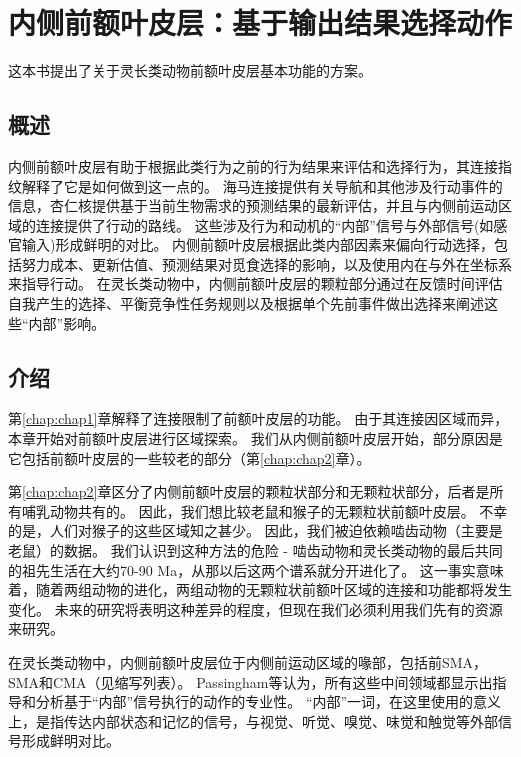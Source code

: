 \chapter{内侧前额叶皮层：基于输出结果选择动作} \label{chap:chap3}

这本书提出了关于灵长类动物前额叶皮层基本功能的方案。



\section{概述}
内侧前额叶皮层有助于根据此类行为之前的行为结果来评估和选择行为，其连接指纹解释了它是如何做到这一点的。
海马连接提供有关导航和其他涉及行动事件的信息，杏仁核提供基于当前生物需求的预测结果的最新评估，并且与内侧前运动区域的连接提供了行动的路线。
这些涉及行为和动机的“内部”信号与外部信号(如感官输入)形成鲜明的对比。
内侧前额叶皮层根据此类内部因素来偏向行动选择，包括努力成本、更新估值、预测结果对觅食选择的影响，以及使用内在与外在坐标系来指导行动。
在灵长类动物中，内侧前额叶皮层的颗粒部分通过在反馈时间评估自我产生的选择、平衡竞争性任务规则以及根据单个先前事件做出选择来阐述这些“内部”影响。\par



\section{介绍}

第\ref{chap:chap1}章解释了连接限制了前额叶皮层的功能。
由于其连接因区域而异，本章开始对前额叶皮层进行区域探索。
我们从内侧前额叶皮层开始，部分原因是它包括前额叶皮层的一些较老的部分（第\ref{chap:chap2}章）。\par

第\ref{chap:chap2}章区分了内侧前额叶皮层的颗粒状部分和无颗粒状部分，后者是所有哺乳动物共有的。
因此，我们想比较老鼠和猴子的无颗粒状前额叶皮层。
不幸的是，人们对猴子的这些区域知之甚少。
因此，我们被迫依赖啮齿动物（主要是老鼠）的数据。
我们认识到这种方法的危险 - 啮齿动物和灵长类动物的最后共同的祖先生活在大约70-90 Ma，从那以后这两个谱系就分开进化了。
这一事实意味着，随着两组动物的进化，两组动物的无颗粒状前额叶区域的连接和功能都将发生变化。
未来的研究将表明这种差异的程度，但现在我们必须利用我们先有的资源来研究。\par


在灵长类动物中，内侧前额叶皮层位于内侧前运动区域的喙部，包括前SMA，SMA和CMA（见缩写列表）。
Passingham等\cite{passingham2010medial}认为，所有这些中间领域都显示出指导和分析基于“内部”信号执行的动作的专业性。
“内部”一词，在这里使用的意义上，是指传达内部状态和记忆的信号，与视觉、听觉、嗅觉、味觉和触觉等外部信号形成鲜明对比。



